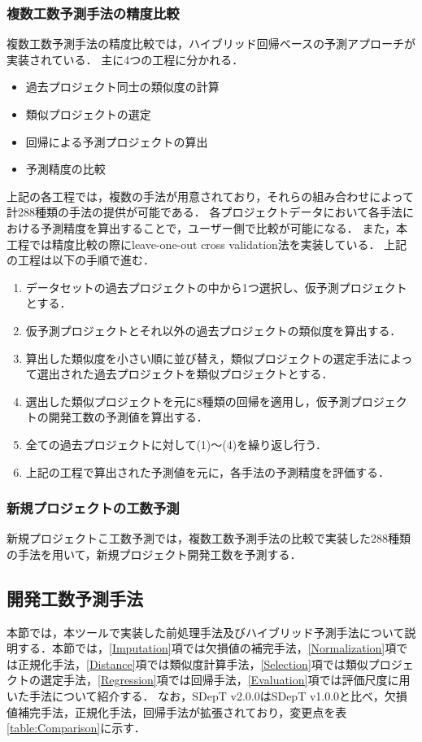 \subsubsection{複数工数予測手法の精度比較}\label{PastPrediction}
複数工数予測手法の精度比較では，ハイブリッド回帰ベースの予測アプローチ\cite{Hybrid}が実装されている．
主に4つの工程に分かれる．
\begin{itemize}
  \item 過去プロジェクト同士の類似度の計算
  \item 類似プロジェクトの選定
  \item 回帰による予測プロジェクトの算出
  \item 予測精度の比較
\end{itemize}
上記の各工程では，複数の手法が用意されており，それらの組み合わせによって計288種類の手法の提供が可能である．
各プロジェクトデータにおいて各手法における予測精度を算出することで，ユーザー側で比較が可能になる．
また，本工程では精度比較の際にleave-one-out cross validation法\cite{Kohavi1995}を実装している．
上記の工程は以下の手順で進む．
\begin{enumerate}[label=(\arabic*)]
  \item データセットの過去プロジェクトの中から1つ選択し、仮予測プロジェクトとする．
  \item 仮予測プロジェクトとそれ以外の過去プロジェクトの類似度を算出する．
  \item 算出した類似度を小さい順に並び替え，類似プロジェクトの選定手法によって選出された過去プロジェクトを類似プロジェクトとする．
  \item 選出した類似プロジェクトを元に8種類の回帰を適用し，仮予測プロジェクトの開発工数の予測値を算出する．
  \item 全ての過去プロジェクトに対して(1)～(4)を繰り返し行う．
  \item 上記の工程で算出された予測値を元に，各手法の予測精度を評価する．
\end{enumerate}
\subsubsection{新規プロジェクトの工数予測}\label{NewPrediction}
新規プロジェクトこ工数予測では，複数工数予測手法の比較で実装した288種類の手法を用いて，新規プロジェクト開発工数を予測する．

\clearpage
\subsection{開発工数予測手法}\label{subsec:3.3}

本節では，本ツールで実装した前処理手法及びハイブリッド予測手法\cite{Hybrid}について説明する．本節では，\ref{Imputation}項では欠損値の補完手法，\ref{Normalization}項では正規化手法，\ref{Distance}項では類似度計算手法，\ref{Selection}項では類似プロジェクトの選定手法，\ref{Regression}項では回帰手法，\ref{Evaluation}項では評価尺度に用いた手法について紹介する．
なお，SDepT v2.0.0はSDepT v1.0.0と比べ，欠損値補完手法，正規化手法，回帰手法が拡張されており，変更点を表\ref{table:Comparison}に示す．


